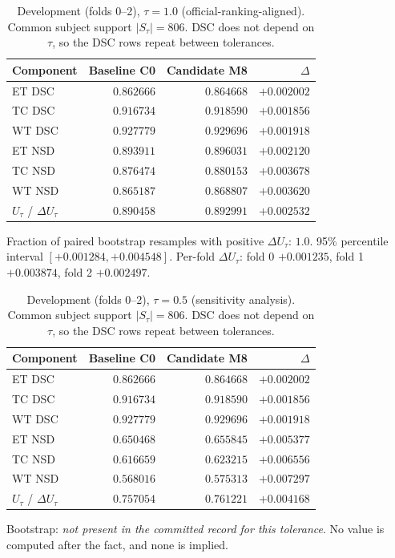 \documentclass[runningheads]{llncs}
\begin{document}
\begin{table}[htbp]\centering
\caption{Development (folds 0--2), $\tau=1.0$ (official-ranking-aligned). Common subject support $|S_\tau|=806$. DSC does not
depend on $\tau$, so the DSC rows repeat between tolerances.}
\begin{tabular}{@{}lrrr@{}}
\toprule
Component & Baseline C0 & Candidate M8 & $\Delta$ \\
\midrule
ET DSC & $0.862666$ & $0.864668$ & $+0.002002$ \\
TC DSC & $0.916734$ & $0.918590$ & $+0.001856$ \\
WT DSC & $0.927779$ & $0.929696$ & $+0.001918$ \\
ET NSD & $0.893911$ & $0.896031$ & $+0.002120$ \\
TC NSD & $0.876474$ & $0.880153$ & $+0.003678$ \\
WT NSD & $0.865187$ & $0.868807$ & $+0.003620$ \\
\midrule
$U_\tau$ / $\Delta U_\tau$ & $0.890458$ & $0.892991$ & $+0.002532$ \\
\bottomrule
\end{tabular}
\par\medskip
\begin{minipage}{0.92\textwidth}\small Fraction of paired bootstrap resamples with positive $\Delta U_\tau$: $1.0$. 95\% percentile interval $[+0.001284,+0.004548]$. Per-fold $\Delta U_\tau$: fold 0 $+0.001235$, fold 1 $+0.003874$, fold 2 $+0.002497$.\end{minipage}
\end{table}

\begin{table}[htbp]\centering
\caption{Development (folds 0--2), $\tau=0.5$ (sensitivity analysis). Common subject support $|S_\tau|=806$. DSC does not
depend on $\tau$, so the DSC rows repeat between tolerances.}
\begin{tabular}{@{}lrrr@{}}
\toprule
Component & Baseline C0 & Candidate M8 & $\Delta$ \\
\midrule
ET DSC & $0.862666$ & $0.864668$ & $+0.002002$ \\
TC DSC & $0.916734$ & $0.918590$ & $+0.001856$ \\
WT DSC & $0.927779$ & $0.929696$ & $+0.001918$ \\
ET NSD & $0.650468$ & $0.655845$ & $+0.005377$ \\
TC NSD & $0.616659$ & $0.623215$ & $+0.006556$ \\
WT NSD & $0.568016$ & $0.575313$ & $+0.007297$ \\
\midrule
$U_\tau$ / $\Delta U_\tau$ & $0.757054$ & $0.761221$ & $+0.004168$ \\
\bottomrule
\end{tabular}
\par\medskip
\begin{minipage}{0.92\textwidth}\small Bootstrap: \emph{not present in the committed record for this tolerance}. No value is computed after the fact, and none is implied. \end{minipage}
\end{table}
\end{document}
